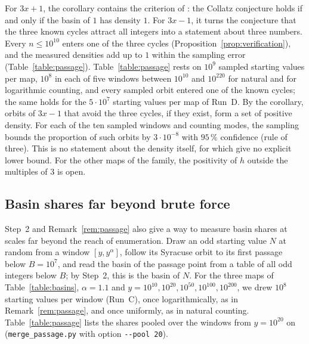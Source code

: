 \documentclass[12pt]{amsart}
\theoremstyle{definition}
\theoremstyle{remark}
\begin{document}
For $3x+1$, the corollary contains the criterion of \cite{Mazur_Pred_2026}: the Collatz conjecture holds if and only if the basin of $1$ has density $1$. For $3x-1$, it turns the conjecture that the three known cycles attract all integers into a statement about three numbers. Every $n\le10^{10}$ enters one of the three cycles (Proposition~\ref{prop:verification}), and the measured densities add up to $1$ within the sampling error (Table~\ref{table:passage}). Table~\ref{table:passage} rests on $10^9$ sampled starting values per map, $10^8$ in each of five windows between $10^{10}$ and $10^{220}$ for natural and for logarithmic counting, and every sampled orbit entered one of the known cycles; the same holds for the $5\cdot10^7$ starting values per map of Run~D. By the corollary, orbits of $3x-1$ that avoid the three cycles, if they exist, form a set of positive density. For each of the ten sampled windows and counting modes, the sampling bounds the proportion of such orbits by $3\cdot10^{-8}$ with $95\,\%$ confidence (rule of three). This is no statement about the density itself, for which \cite{Mazur_Pred_2026,ElJaouhari_2026} give no explicit lower bound. For the other maps of the family, the positivity of $h$ outside the multiples of $3$ is open.

\subsection*{Basin shares far beyond brute force}
Step~2 and Remark~\ref{rem:passage} also give a way to measure basin shares at scales far beyond the reach of enumeration. Draw an odd starting value $N$ at random from a window $[y,y^\alpha]$, follow its Syracuse orbit to its first passage below $B=10^7$, and read the basin of the passage point from a table of all odd integers below $B$; by Step~2, this is the basin of $N$. For the three maps of Table~\ref{table:basins}, $\alpha=1.1$ and $y=10^{10},10^{20},10^{50},10^{100},10^{200}$, we drew $10^8$ starting values per window (Run~C), once logarithmically, as in Remark~\ref{rem:passage}, and once uniformly, as in natural counting. Table~\ref{table:passage} lists the shares pooled over the windows from $y=10^{20}$ on (\texttt{merge\_passage.py} with option \texttt{-{}-pool 20}).
\end{document}
